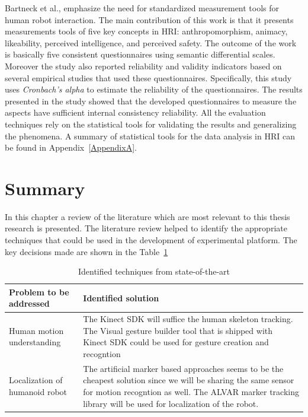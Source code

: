 {\begin{table}[H]
\begin{tabularx}{400pt}{c*3{X}}
  										\bottomrule
\end{tabularx}
\end{table}
Bartneck et al., \cite{bartneck2009measurement} emphasize the need for standardized measurement tools for human robot interaction. The main contribution of this work is that it presents measurements tools of five key concepts in HRI: anthropomorphism, animacy, likeability, perceived intelligence, and perceived safety. The outcome of the work is basically five consistent questionnaires using semantic differential scales. Moreover the study also reported reliability and validity indicators based on several empirical studies that used these questionnaires. Specifically, this study uses \emph{Cronbach's alpha} to estimate the reliability of the questionnaires. The results presented in the study showed that the developed questionnaires to measure the aspects have sufficient internal consistency reliability. All the evaluation techniques rely on the statistical tools for validating the results and generalizing the phenomena. A summary of statistical tools for the data analysis in HRI can be found in Appendix~\ref{AppendixA}.


\section{Summary}

In this chapter a review of the literature which are most relevant to this thesis research is presented. The literature review helped to identify the appropriate techniques that could be used in the development of experimental platform. The key decisions made are shown in the Table~\ref{table:review_decisions}

\begin{table}[H]
\centering
\small
\caption{Identified techniques from state-of-the-art}
\label{table:review_decisions}
\begin{tabularx}{400pt}{|X|X|}
\hline
  \textbf{Problem to be addressed} & \textbf{Identified solution}
  \tabularnewline \hline
  
  \multirow{1}{*}{Human motion understanding} & The Kinect SDK \cite{KinectSDK2014} will suffice the human skeleton tracking. The Visual gesture builder tool that is shipped with Kinect SDK could be used for gesture creation and recogntion
                                          \tabularnewline\hline
                                          
  \multirow{1}{*}{Localization of humanoid robot} & The artificial marker based approaches seems to be the cheapest solution since we will be sharing the same sensor for motion recogntion as well. The ALVAR marker tracking library \cite{ALVAR} will be used for localization of the robot. 
                                          \tabularnewline\hline
  

\end{tabularx}
\end{table}}
